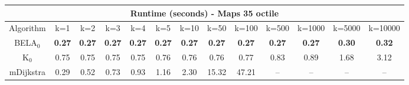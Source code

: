 \begin{tabular}{c|cccccccccccc}\toprule
\multicolumn{13}{c}{Runtime (seconds) - Maps 35 octile}\\ \midrule
Algorithm & k=1 & k=2 & k=3 & k=4 & k=5 & k=10 & k=50 & k=100 & k=500 & k=1000 & k=5000 & k=10000 \\ \midrule
BELA$_0$ & \textbf{0.27} & \textbf{0.27} & \textbf{0.27} & \textbf{0.27} & \textbf{0.27} & \textbf{0.27} & \textbf{0.27} & \textbf{0.27} & \textbf{0.27} & \textbf{0.27} & \textbf{0.30} & \textbf{0.32} \\
K$_0$ & 0.75 & 0.75 & 0.75 & 0.75 & 0.76 & 0.76 & 0.76 & 0.77 & 0.83 & 0.89 & 1.68 & 3.12 \\
mDijkstra & 0.29 & 0.52 & 0.73 & 0.93 & 1.16 & 2.30 & 15.32 & 47.21 & -- & -- & -- & -- \\ \bottomrule 
\end{tabular}

